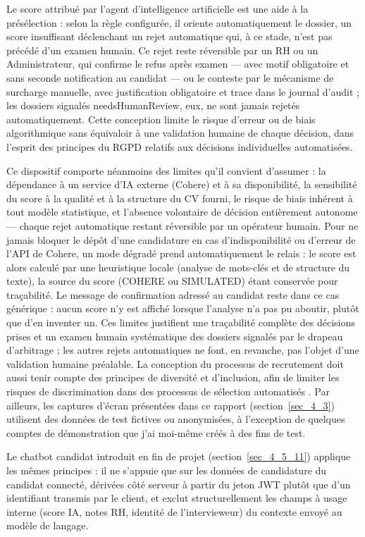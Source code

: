 Le score attribué par l’agent d’intelligence artificielle est une aide à la présélection : selon la règle configurée, il oriente automatiquement le dossier, un score insuffisant déclenchant un rejet automatique qui, à ce stade, n’est pas précédé d’un examen humain. Ce rejet reste réversible par un RH ou un Administrateur, qui confirme le refus après examen — avec motif obligatoire et sans seconde notification au candidat — ou le conteste par le mécanisme de surcharge manuelle, avec justification obligatoire et trace dans le journal d’audit ; les dossiers signalés needs\-Human\-Review, eux, ne sont jamais rejetés automatiquement. Cette conception limite le risque d’erreur ou de biais algorithmique sans équivaloir à une validation humaine de chaque décision, dans l’esprit des principes du RGPD \cite{ref17,ref18} relatifs aux décisions individuelles automatisées.

Ce dispositif comporte néanmoins des limites qu’il convient d’assumer : la dépendance à un service d’IA externe (Cohere) et à sa disponibilité, la sensibilité du score à la qualité et à la structure du CV fourni, le risque de biais inhérent à tout modèle statistique, et l’absence volontaire de décision entièrement autonome — chaque rejet automatique restant réversible par un opérateur humain. Pour ne jamais bloquer le dépôt d’une candidature en cas d’indisponibilité ou d’erreur de l’API de Cohere, un mode dégradé prend automatiquement le relais : le score est alors calculé par une heuristique locale (analyse de mots-clés et de structure du texte), la source du score (COHERE ou SIMULATED) étant conservée pour traçabilité. Le message de confirmation adressé au candidat reste dans ce cas générique : aucun score n’y est affiché lorsque l’analyse n’a pas pu aboutir, plutôt que d’en inventer un. Ces limites justifient une traçabilité complète des décisions prises et un examen humain systématique des dossiers signalés par le drapeau d’arbitrage ; les autres rejets automatiques ne font, en revanche, pas l’objet d’une validation humaine préalable. La conception du processus de recrutement doit aussi tenir compte des principes de diversité et d’inclusion, afin de limiter les risques de discrimination dans des processus de sélection automatisés \cite{ref19}. Par ailleurs, les captures d’écran présentées dans ce rapport (section~\ref{sec_4_3}) utilisent des données de test fictives ou anonymisées, à l’exception de quelques comptes de démonstration que j’ai moi-même créés à des fins de test.

Le chatbot candidat introduit en fin de projet (section~\ref{sec_4_5_11}) applique les mêmes principes : il ne s’appuie que sur les données de candidature du candidat connecté, dérivées côté serveur à partir du jeton JWT plutôt que d’un identifiant transmis par le client, et exclut structurellement les champs à usage interne (score IA, notes RH, identité de l’intervieweur) du contexte envoyé au modèle de langage.

